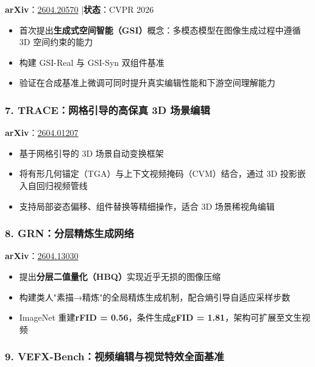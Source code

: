 \textbf{arXiv}：\href{https://arxiv.org/abs/2604.20570}{2604.20570} |\textbf{状态}：CVPR 2026

\begin{itemize}[leftmargin=1.5em]
  \item 首次提出\textbf{生成式空间智能（GSI）}概念：多模态模型在图像生成过程中遵循 3D 空间约束的能力
  \item 构建 GSI-Real 与 GSI-Syn 双组件基准
  \item 验证在合成基准上微调可同时提升真实编辑性能和下游空间理解能力
\end{itemize}

\subsubsection{7. TRACE：网格引导的高保真 3D 场景编辑}

\textbf{arXiv}：\href{https://arxiv.org/abs/2604.01207}{2604.01207}

\begin{itemize}[leftmargin=1.5em]
  \item 基于网格引导的 3D 场景自动变换框架
  \item 将有形几何锚定（TGA）与上下文视频掩码（CVM）结合，通过 3D 投影嵌入自回归视频管线
  \item 支持局部姿态偏移、组件替换等精细操作，适合 3D 场景稀视角编辑
\end{itemize}

\subsubsection{8. GRN：分层精炼生成网络}

\textbf{arXiv}：\href{https://arxiv.org/abs/2604.13030}{2604.13030}

\begin{itemize}[leftmargin=1.5em]
  \item 提出\textbf{分层二值量化（HBQ）}实现近乎无损的图像压缩
  \item 构建类人"素描→精炼"的全局精炼生成机制，配合熵引导自适应采样步数
  \item ImageNet 重建\textbf{rFID = 0.56}，条件生成\textbf{gFID = 1.81}，架构可扩展至文生视频
\end{itemize}

\subsubsection{9. VEFX-Bench：视频编辑与视觉特效全面基准}

